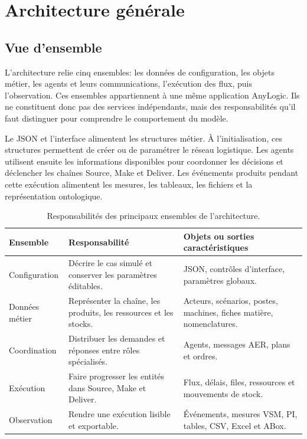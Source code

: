 \chapter{Architecture générale}
\label{chap:architecture}

\section{Vue d'ensemble}

L'architecture relie cinq ensembles: les données de configuration, les objets métier, les agents et leurs communications, l'exécution des flux, puis l'observation. Ces ensembles appartiennent à une même application AnyLogic. Ils ne constituent donc pas des services indépendants, mais des responsabilités qu'il faut distinguer pour comprendre le comportement du modèle.

Le JSON et l'interface alimentent les structures métier. À l'initialisation, ces structures permettent de créer ou de paramétrer le réseau logistique. Les agents utilisent ensuite les informations disponibles pour coordonner les décisions et déclencher les chaînes Source, Make et Deliver. Les événements produits pendant cette exécution alimentent les mesures, les tableaux, les fichiers et la représentation ontologique.


\begin{table}[H]
  \centering
  \begin{tabularx}{\textwidth}{L{0.21\textwidth} Y Y}
    \toprule
    Ensemble & Responsabilité & Objets ou sorties caractéristiques \\
    \midrule
    Configuration & Décrire le cas simulé et conserver les paramètres éditables. & JSON, contrôles d'interface, paramètres globaux. \\
    Données métier & Représenter la chaîne, les produits, les ressources et les stocks. & Acteurs, scénarios, postes, machines, fiches matière, nomenclatures. \\
    Coordination & Distribuer les demandes et réponses entre rôles spécialisés. & Agents, messages AER, plans et ordres. \\
    Exécution & Faire progresser les entités dans Source, Make et Deliver. & Flux, délais, files, ressources et mouvements de stock. \\
    Observation & Rendre une exécution lisible et exportable. & Événements, mesures VSM, PI, tables, CSV, Excel et ABox. \\
    \bottomrule
  \end{tabularx}
  \caption{Responsabilités des principaux ensembles de l'architecture.}
  \label{tab:responsabilites-architecture}
\end{table}


